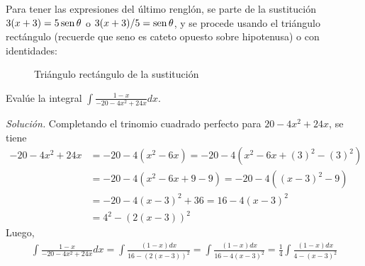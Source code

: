 Para tener las expresiones del último renglón, se parte de la sustitución $3(x+3) = 5 \operatorname{sen}\theta$ o $3(x+3)/5= \operatorname{sen}\theta$, y se procede usando el triángulo rectángulo (recuerde que seno es cateto opuesto sobre hipotenusa) o con identidades:

\begin{figure}[H]
\centering
\caption{Triángulo rectángulo de la sustitución}
\propia
\end{figure}

\begin{ejemplo}
Evalúe la integral $\int \frac{1-x}{-20-4x^{2}+24x}dx$.
\end{ejemplo}
\emph{Solución.} Completando el trinomio cuadrado perfecto para $20-4x^{2}+24x$, se tiene
\begin{align*}
-20-4x^{2}+24x&=-20-4(x^{2}-6x)=-20-4(x^{2}-6x+(3)^{2}-(3)^{2}) \\
&=-20-4(x^{2}-6x+9-9)=-20-4((x-3)^{2}-9)\\
&=-20-4(x-3)^{2}+36=16-4(x-3)^{2}\\
&=4^{2}-(2(x-3))^{2}
\end{align*}
Luego,
\begin{gather*}
\int \frac{1-x}{-20-4x^{2}+24x}dx=\int \frac{(1-x)dx}{16-(2(x-3))^{2}}
=\int \frac{(1-x)dx}{16-4(x-3)^{2}}=\frac{1}{4}\int \frac{(1-x)dx}{4-(x-3)^{2}}
\end{gather*}

